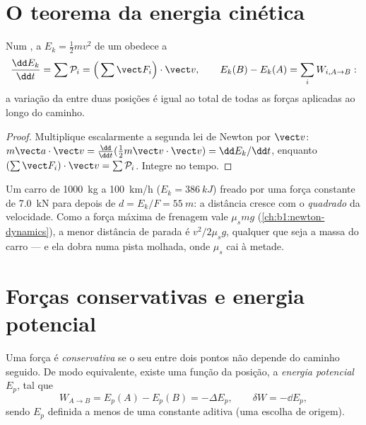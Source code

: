\section{O teorema da energia cinética}

\begin{theorem}\label{thm:b1:work-and-energy:ke}
Num , a \emph{} $E_k = \tfrac12 mv^2$ de
um  obedece a
\[
\frac{\dd E_k}{\dd t} = \sum\mathcal P_i = \Big(\sum\vect F_i\Big)\cdot\vect v,
\qquad
E_k(B) - E_k(A) = \sum_i W_{i,A\to B}:
\]
a variação da  entre duas posições é igual ao  total
de todas as forças aplicadas ao longo do caminho.
\end{theorem}

\begin{proof}
Multiplique escalarmente a segunda lei de Newton por $\vect v$: $m\vect a\cdot\vect v =
\tfrac{\dd}{\dd t}(\tfrac12 m\vect v\cdot\vect v) = \dd E_k/\dd t$, enquanto
$(\sum\vect F_i)\cdot\vect v = \sum\mathcal P_i$. Integre no tempo.
\end{proof}

\begin{example}\label{ex:b1:work-and-energy:braking}
Um carro de \qty{1000}{kg} a \qty{100}{km/h} ($E_k = \qty{386}{kJ}$) freado por
uma força constante de \qty{7.0}{kN} para depois de $d = E_k/F = \qty{55}{m}$:
a distância cresce com o \emph{quadrado} da velocidade. Como a
força máxima de frenagem vale $\mu_smg$ (\cref{ch:b1:newton-dynamics}), a
menor distância de parada é $v^2/2\mu_sg$, qualquer que seja a massa do carro ---
e ela dobra numa pista molhada, onde $\mu_s$ cai à metade.
\end{example}

\section{Forças conservativas e energia potencial}

\begin{definition}\label{def:b1:work-and-energy:conservative}
Uma força é \emph{conservativa} se o seu  entre dois pontos não
depende do caminho seguido. De modo equivalente, existe uma função da
posição, a \emph{energia potencial} $E_p$, tal que
\[
W_{A\to B} = E_p(A) - E_p(B) = -\Delta E_p ,
\qquad \delta W = -\dd E_p ,
\]
sendo $E_p$ definida a menos de uma constante aditiva (uma escolha de origem).
\end{definition}

